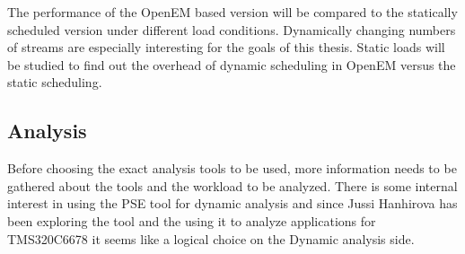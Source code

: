 The performance of the OpenEM based version will be compared to the statically scheduled version under different load conditions. Dynamically changing numbers of streams are especially interesting for the goals of this thesis. Static loads will be studied to find out the overhead of dynamic scheduling in OpenEM versus the static scheduling. 

\subsection{Analysis}
Before choosing the exact analysis tools to be used, more information needs to be gathered about the tools and the workload to be analyzed. There is some internal interest in using the PSE tool for dynamic analysis and since Jussi Hanhirova has been exploring the tool and the using it to analyze applications for TMS320C6678 it seems like a logical choice on the Dynamic analysis side.